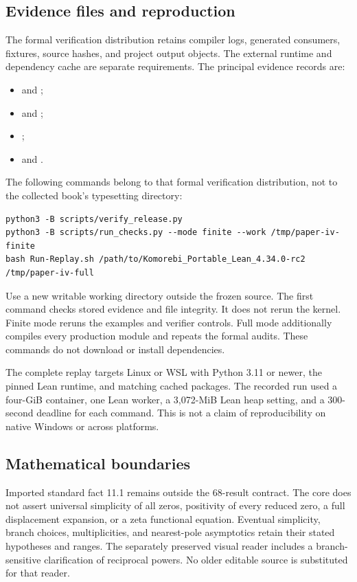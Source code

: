 \subsection{Evidence files and reproduction}
The formal verification distribution retains compiler logs, generated consumers, fixtures, source hashes, and project output objects. The external runtime and dependency cache are separate requirements. The principal evidence records are:
\begin{itemize}
\item {} and ;
\item {} and ;
\item {};
\item {} and .
\end{itemize}
The following commands belong to that formal verification distribution, not to the collected book's typesetting directory:
\begin{Verbatim}[fontsize=\small,breaklines=true,breakanywhere=true]
python3 -B scripts/verify_release.py
python3 -B scripts/run_checks.py --mode finite --work /tmp/paper-iv-finite
bash Run-Replay.sh /path/to/Komorebi_Portable_Lean_4.34.0-rc2 /tmp/paper-iv-full
\end{Verbatim}
Use a new writable working directory outside the frozen source. The first command checks stored evidence and file integrity. It does not rerun the kernel. Finite mode reruns the examples and verifier controls. Full mode additionally compiles every production module and repeats the formal audits. These commands do not download or install dependencies.

The complete replay targets Linux or WSL with Python 3.11 or newer, the pinned Lean runtime, and matching cached packages. The recorded run used a four-GiB container, one Lean worker, a 3,072-MiB Lean heap setting, and a 300-second deadline for each command. This is not a claim of reproducibility on native Windows or across platforms.

\subsection{Mathematical boundaries}
Imported standard fact 11.1 remains outside the 68-result contract. The core does not assert universal simplicity of all zeros, positivity of every reduced zero, a full displacement expansion, or a zeta functional equation. Eventual simplicity, branch choices, multiplicities, and nearest-pole asymptotics retain their stated hypotheses and ranges. The separately preserved visual reader includes a branch-sensitive clarification of reciprocal powers. No older editable source is substituted for that reader.
